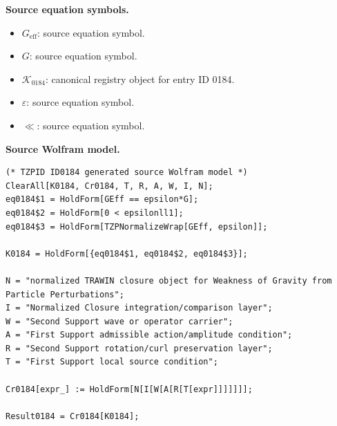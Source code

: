 \begin{minipage}[t]{0.49\linewidth}
\begingroup
\small
\raggedright
\textbf{Source equation symbols.}\par
\begin{itemize}[leftmargin=1.35em,itemsep=1pt,topsep=1pt,parsep=0pt]
    \item $G_{\mathrm{eff}}$: source equation symbol.
    \item $G$: source equation symbol.
    \item $\mathcal{K}_{0184}$: canonical registry object for entry ID 0184.
    \item $\varepsilon$: source equation symbol.
    \item $\ll$: source equation symbol.
\end{itemize}
\endgroup
\end{minipage}\hfill
\begin{minipage}[t]{0.47\linewidth}
\begingroup
\scriptsize
\raggedright
\textbf{Source Wolfram model.}\par
\begin{Verbatim}[fontsize=\tiny,breaklines=true,breakanywhere=true]
(* TZPID ID0184 generated source Wolfram model *)
ClearAll[K0184, Cr0184, T, R, A, W, I, N];
eq0184$1 = HoldForm[GEff == epsilon*G];
eq0184$2 = HoldForm[0 < epsilonll1];
eq0184$3 = HoldForm[TZPNormalizeWrap[GEff, epsilon]];

K0184 = HoldForm[{eq0184$1, eq0184$2, eq0184$3}];

N = "normalized TRAWIN closure object for Weakness of Gravity from Particle Perturbations";
I = "Normalized Closure integration/comparison layer";
W = "Second Support wave or operator carrier";
A = "First Support admissible action/amplitude condition";
R = "Second Support rotation/curl preservation layer";
T = "First Support local source condition";

Cr0184[expr_] := HoldForm[N[I[W[A[R[T[expr]]]]]]];

Result0184 = Cr0184[K0184];
\end{Verbatim}
\endgroup
\end{minipage}

